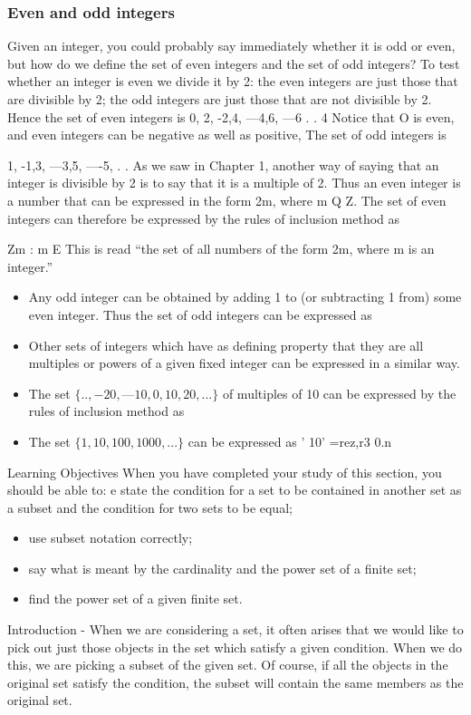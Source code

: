 \smallskip 
\frametitle{Even and odd integers}
Given an integer, you could probably say immediately whether it is odd or even, but how do we
deﬁne the set of even integers and the set of odd integers? To test whether an integer is even we
divide it by 2: the even integers are just those that are divisible by 2; the odd integers are just
those that are not divisible by 2. Hence the set of even integers is
{0, 2, -2,4, —4,6, —6 . . 4}
\smallskip 
\smallskip 
Notice that O is even, and even integers can be negative as well as positive, The set of odd integers
is
{1, -1,3, —3,5, —-5, . . 
As we saw in Chapter 1, another way of saying that an integer is divisible by 2 is to say that it is
a multiple of 2. Thus an even integer is a number that can be expressed in the form 2m, where
m Q Z. The set of even integers can therefore be expressed by the rules of inclusion method as
{Zm : m E 
This is read
“the set of all numbers of the form 2m, where m is an integer.”
\smallskip 
\smallskip 
\begin{itemize}
\item Any odd integer can be obtained by adding 1 to (or subtracting 1 from) some even integer. Thus
the set of odd integers can be expressed as
\item Other sets of integers which have as deﬁning property that they are all multiples or powers of a
given ﬁxed integer can be expressed in a similar way.
\end{itemize}

\smallskip 
\smallskip 
\begin{itemize}
\item The set $\{.. ,-20,—10,0,10,20,...\}$ of multiples of 10 can be expressed by the rules
of inclusion method as
\item The set $\{1,10,100,1000,...\}$ can be expressed as ’
{10' =rez,r3 0}.n
\end{itemize}
\smallskip 
\smallskip 

Learning Objectives
When you have completed your study of this section, you should be able to:
e state the condition for a set to be contained in another set as a subset and the condition for
two sets to be equal; 
\begin{itemize}
\item use subset notation correctly;
\item  say what is meant by the cardinality and the power set of a finite set;
\item  ﬁnd the power set of a given ﬁnite set.
\end{itemize}
\smallskip 
\smallskip 
Introduction -
When we are considering a set, it often arises that we would like to pick out just those objects in
the set which satisfy a given condition. When we do this, we are picking a subset of the given set.
Of course, if all the objects in the original set satisfy the condition, the subset will contain the
same members as the original set. 


}}
